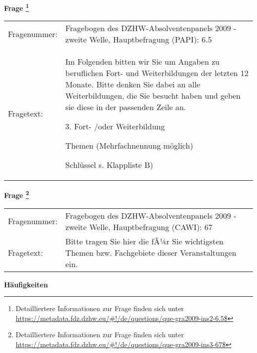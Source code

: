 				\vspace*{0.5cm}
                \noindent\textbf{Frage
	                \footnote{Detailliertere Informationen zur Frage finden sich unter
		              \url{https://metadata.fdz.dzhw.eu/\#!/de/questions/que-gra2009-ins2-6.5$}}}\\
				\begin{tabularx}{\hsize}{@{}lX}
					Fragenummer: &
					  Fragebogen des DZHW-Absolventenpanels 2009 - zweite Welle, Hauptbefragung (PAPI):
					  6.5
 \\
					Fragetext: & Im Folgenden bitten wir Sie um Angaben zu beruflichen Fort- und Weiterbildungen der letzten 12 Monate. Bitte denken Sie dabei an alle Weiterbildungen, die Sie besucht haben und geben sie diese in der passenden Zeile an.\par  3. Fort- /oder Weiterbildung\par  Themen (Mehrfachnennung möglich)\par  Schlüssel s. Klappliste B) \\
				\end{tabularx}
				\vspace*{0.5cm}
                \noindent\textbf{Frage
	                \footnote{Detailliertere Informationen zur Frage finden sich unter
		              \url{https://metadata.fdz.dzhw.eu/\#!/de/questions/que-gra2009-ins3-67$}}}\\
				\begin{tabularx}{\hsize}{@{}lX}
					Fragenummer: &
					  Fragebogen des DZHW-Absolventenpanels 2009 - zweite Welle, Hauptbefragung (CAWI):
					  67
 \\
					Fragetext: & Bitte tragen Sie hier die fÃ¼r Sie wichtigsten Themen bzw. Fachgebiete dieser Veranstaltungen ein. \\
				\end{tabularx}





        		\vspace*{0.5cm}
                \noindent\textbf{Häufigkeiten}

